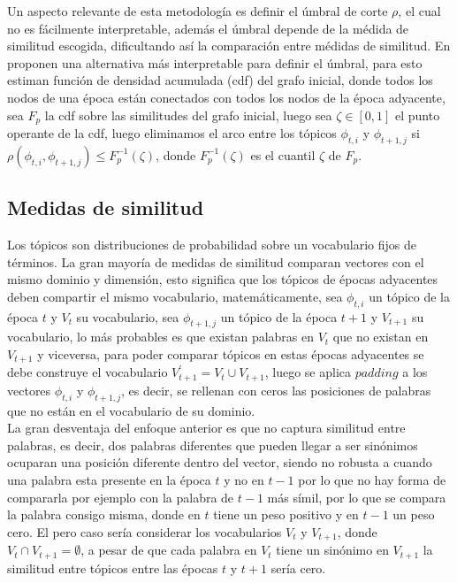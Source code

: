 \documentclass[letterpaper,12pt,oneside]{book} %
\begin{document}
Un aspecto relevante de esta metodología es definir el úmbral de corte $\rho$, el cual no es fácilmente interpretable, además el úmbral depende de la médida de similitud escogida, dificultando así la comparación entre médidas de similitud. En \cite{beykikhoshk2018discovering} proponen una alternativa más interpretable para definir el úmbral, para esto estiman función de densidad acumulada (cdf) del grafo inicial, donde todos los nodos de una época están conectados con todos los nodos de la época adyacente, sea $F_{p}$ la cdf sobre las similitudes del grafo inicial, luego sea $\zeta \in [0,1]$ el punto operante de la cdf, luego eliminamos el arco entre los tópicos $\phi_{t,i}$ y $\phi_{t+1,j}$ si $\rho(\phi_{t,i}, \phi_{t+1,j})\leq F_{p}^{-1}(\zeta)$, donde  $F_{p}^{-1}(\zeta)$ es el cuantil $\zeta$ de $F_{p}$.

\subsection{Medidas de similitud}
Los tópicos son distribuciones de probabilidad sobre un vocabulario fijos de términos. La gran mayoría de medidas de similitud comparan vectores con el mismo dominio y dimensión, esto significa que los tópicos de épocas adyacentes deben compartir el mismo vocabulario, matemáticamente, sea $\phi_{t, i}$ un tópico de la época $t$ y $V_{t}$ su vocabulario, sea  $\phi_{t+1, j}$ un tópico de la época $t+1$ y $V_{t+1}$ su vocabulario, lo más probables es que existan palabras en $V_{t}$ que no existan en $V_{t+1}$ y viceversa, para poder comparar tópicos en estas épocas adyacentes se debe construye el vocabulario $V_{t+1}^{'}=V_{t}\cup V_{t+1}$, luego se aplica $padding$ a los vectores $\phi_{t, i}$ y $\phi_{t+1, j}$, es decir, se rellenan con ceros las posiciones de palabras que no están en el vocabulario de su dominio.\\

La gran desventaja del enfoque anterior es que no captura similitud entre palabras, es decir, dos palabras diferentes que pueden llegar a ser sinónimos ocuparan una posición diferente dentro del vector, siendo no robusta a cuando una palabra esta presente en la época $t$ y no en $t-1$ por lo que no hay forma de compararla por ejemplo con la palabra de $t-1$ más símil, por lo que se compara la palabra consigo misma, donde en $t$ tiene un peso positivo y en $t-1$ un peso cero. El pero caso sería considerar los vocabularios $V_{t}$ y $V_{t+1}$, donde $V_{t}\cap V_{t+1} =  \emptyset$, a pesar de que cada palabra en $V_{t}$ tiene un sinónimo en $V_{t+1}$ la similitud entre tópicos entre las épocas $t$ y $t+1$ sería cero.\\
\end{document}
